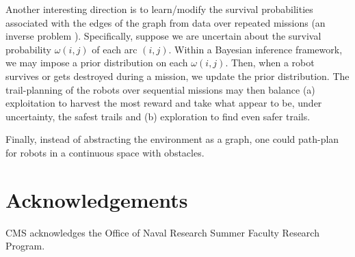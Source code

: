\documentclass[fleqn,10pt,lineno]{wlpeerj}
\begin{document}
Another interesting direction is to learn/modify the survival probabilities associated with the edges of the graph from data over repeated missions (an inverse problem \cite{burton1992instance}). 
Specifically, suppose we are uncertain about the survival probability $\omega(i, j)$ of each arc $(i,j)$. Within a Bayesian inference framework, we may impose a prior distribution on each $\omega(i,j)$. Then, when a robot survives or gets destroyed during a mission, we update the prior distribution. 
The trail-planning of the robots over sequential missions may then balance (a) exploitation to harvest the most reward and take what appear to be, under uncertainty, the safest trails and (b) exploration to find even safer trails.

Finally, instead of abstracting the environment as a graph, one could path-plan for robots in a continuous space with obstacles. 

\section*{Acknowledgements} CMS acknowledges the Office of Naval Research Summer Faculty Research Program.



\end{document}
